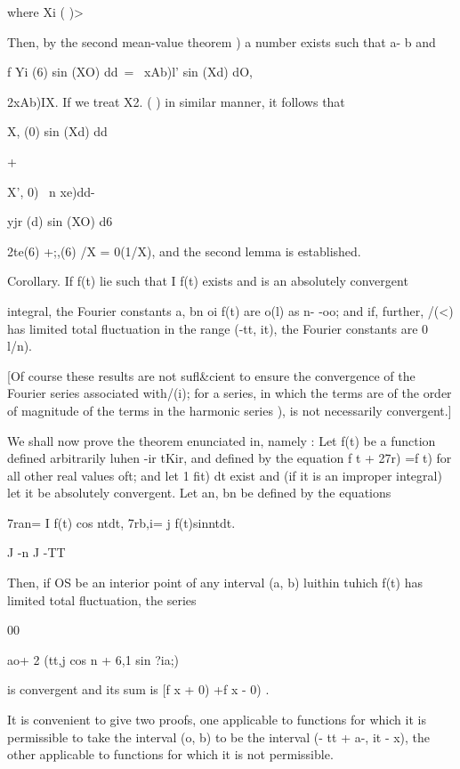 where Xi ( )> %

Then, by the second mean-value theorem ) a number exists such
that a- b and

f Yi (6) sin (XO) dd\ = \ xAb)l' sin (Xd) dO,

 2xAb)IX. If we treat X2. ( ) in similar manner, it follows that

X, (0) sin (Xd) dd

+

X', 0) \ n xe)dd-

yjr (d) sin (XO) d6

 2te(6) +;,(6) /X = 0(1/X), and the second lemma is established.

Corollary. If f(t) lie such that I f(t) exists and is an absolutely
convergent

integral, the Fourier constants a, bn oi f(t) are o(l) as n- -oo;
and if, further, /(<) has limited total fluctuation in the range (-tt,
it), the Fourier constants are 0 l/n).

[Of course these results are not sufl\&cient to ensure the convergence
of the Fourier series associated with/(i); for a series, in which the
terms are of the order of magnitude of the terms in the harmonic
series ), is not necessarily convergent.]

%
%


We shall now prove the theorem enunciated in, namely : Let f(t)
be a function defined arbitrarily luhen -ir tKir, and defined by the
equation f t + 27r) =f t) for all other real values oft; and let 1
fit) dt exist and (if it is an improper integral) let it be absolutely
convergent. Let an, bn be defined by the equations

7ran= I f(t) cos ntdt, 7rb,i= j f(t)sinntdt.

J -n J -TT

Then, if OS be an interior point of any interval (a, b) luithin tuhich
f(t) has limited total fluctuation, the series

00

 ao+ 2 (tt,j cos n + 6,1 sin ?ia;)

is convergent and its sum is [f x + 0) +f x - 0) .

It is convenient to give two proofs, one applicable to functions for
which it is permissible to take the interval (o, b) to be the interval
(- tt + a-, it - x), the other applicable to functions for which it is
not permissible.

